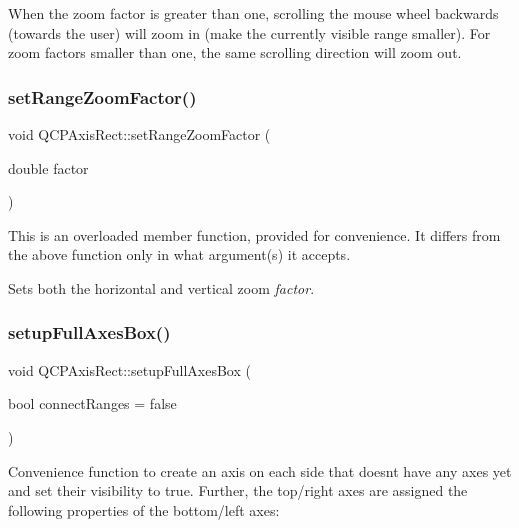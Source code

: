 When the zoom factor is greater than one, scrolling the mouse wheel backwards (towards the user) will zoom in (make the currently visible range smaller). For zoom factors smaller than one, the same scrolling direction will zoom out. \mbox{\label{class_q_c_p_axis_rect_ae83d187b03fc6fa4f00765ad50cd3fc3}} 
\subsubsection{\texorpdfstring{set\+Range\+Zoom\+Factor()}{setRangeZoomFactor()}\hspace{0.1cm}{\footnotesize\ttfamily [2/2]}}
{\footnotesize\ttfamily void Q\+C\+P\+Axis\+Rect\+::set\+Range\+Zoom\+Factor (\begin{DoxyParamCaption}\item[{double}]{factor }\end{DoxyParamCaption})}

This is an overloaded member function, provided for convenience. It differs from the above function only in what argument(s) it accepts.

Sets both the horizontal and vertical zoom {\itshape factor}. \mbox{\label{class_q_c_p_axis_rect_a5fa906175447b14206954f77fc7f1ef4}} 
\subsubsection{\texorpdfstring{setup\+Full\+Axes\+Box()}{setupFullAxesBox()}}
{\footnotesize\ttfamily void Q\+C\+P\+Axis\+Rect\+::setup\+Full\+Axes\+Box (\begin{DoxyParamCaption}\item[{bool}]{connect\+Ranges = {\ttfamily false} }\end{DoxyParamCaption})}

Convenience function to create an axis on each side that doesn\textquotesingle{}t have any axes yet and set their visibility to true. Further, the top/right axes are assigned the following properties of the bottom/left axes\+:

